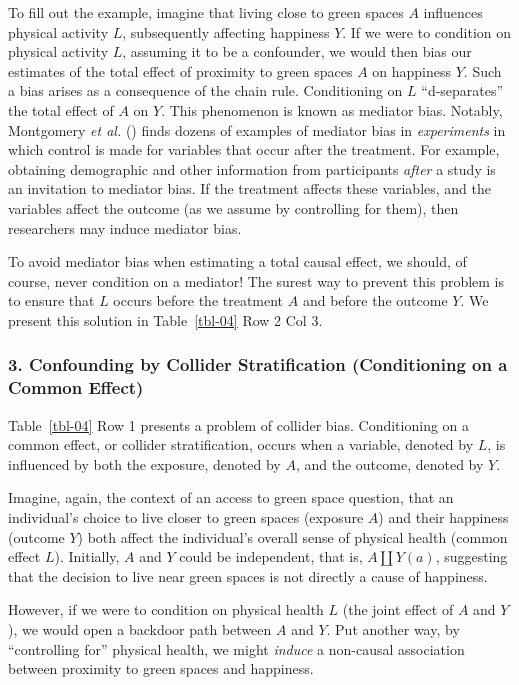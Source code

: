 \documentclass[
  singlecolumn]{article}
\begin{document}
To fill out the example, imagine that living close to green spaces \(A\)
influences physical activity \(L\), subsequently affecting happiness
\(Y\). If we were to condition on physical activity \(L\), assuming it
to be a confounder, we would then bias our estimates of the total effect
of proximity to green spaces \(A\) on happiness \(Y\). Such a bias
arises as a consequence of the chain rule. Conditioning on \(L\)
``d-separates'' the total effect of \(A\) on \(Y\). This phenomenon is
known as mediator bias. Notably, Montgomery \emph{et al.}
() finds dozens of examples of
mediator bias in \emph{experiments} in which control is made for
variables that occur after the treatment. For example, obtaining
demographic and other information from participants \emph{after} a study
is an invitation to mediator bias. If the treatment affects these
variables, and the variables affect the outcome (as we assume by
controlling for them), then researchers may induce mediator bias.

To avoid mediator bias when estimating a total causal effect, we should,
of course, never condition on a mediator! The surest way to prevent this
problem is to ensure that \(L\) occurs before the treatment \(A\) and
before the outcome \(Y\). We present this solution in Table~\ref{tbl-04}
Row 2 Col 3.

\subsubsection{3. Confounding by Collider Stratification (Conditioning
on a Common
Effect)}\label{confounding-by-collider-stratification-conditioning-on-a-common-effect}

Table~\ref{tbl-04} Row 1 presents a problem of collider bias.
Conditioning on a common effect, or collider stratification, occurs when
a variable, denoted by \(L\), is influenced by both the exposure,
denoted by \(A\), and the outcome, denoted by \(Y\).

Imagine, again, the context of an access to green space question, that
an individual's choice to live closer to green spaces (exposure \(A\))
and their happiness (outcome \(Y\)) both affect the individual's overall
sense of physical health (common effect \(L\)). Initially, \(A\) and
\(Y\) could be independent, that is, \(A \coprod Y(a)\), suggesting that
the decision to live near green spaces is not directly a cause of
happiness.

However, if we were to condition on physical health \(L\) (the joint
effect of \(A\) and \(Y\)), we would open a backdoor path between \(A\)
and \(Y\). Put another way, by ``controlling for'' physical health, we
might \emph{induce} a non-causal association between proximity to green
spaces and happiness.
\end{document}
